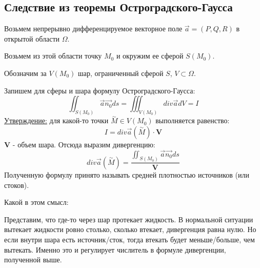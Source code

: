 \documentclass[12pt]{article}
\begin{document}
\subsection{Следствие из теоремы Остроградского-Гаусса}
Возьмем непрерывно дифференцируемое векторное поле $\overrightarrow{a} = (P,Q,R)$ в открытой области $\Omega$.\par
Возьмем из этой области точку $M_0$ и окружим ее сферой $S(M_0)$.\par
Обозначим за $V(M_0)$ шар, ограниченный сферой $S$, $V \subset \Omega$.\par
Запишем для сферы и шара формулу Остроградского-Гаусса:
$$\iint_{S(M_0)} \overrightarrow{a} \overrightarrow{n_0} ds =\iiint_{V(M_0)} div \overrightarrow{a} dV = I$$
\uline{Утверждение:} для какой-то точки $\overset{\sim}{M} \in V(M_0)$ выполняется равенство:
$$I = div \overrightarrow{a} (\overset{\sim}{M}) \cdot \textbf{V}$$
$\textbf{V}$ - объем шара. Отсюда выразим дивергенцию:
$$div \overrightarrow{a} (\overset{\sim}{M}) = \frac{\iint_{S(M_0)} \overrightarrow{a} \overrightarrow{n_0} ds}{\textbf{V}}$$
Полученную формулу принято называть средней плотностью источников (или стоков).\par
Какой в этом смысл:\par
Представим, что где-то через шар протекает жидкость. В нормальной ситуации вытекает жидкости ровно столько, сколько втекает, дивергенция равна нулю. Но если внутри шара есть источник/сток, тогда втекать будет меньше/больше, чем вытекать. Именно это и регулирует числитель в формуле дивергенции, полученной выше.\par
\end{document}
